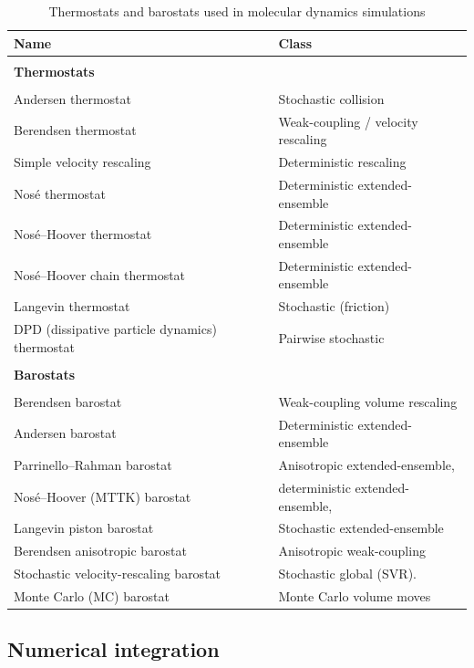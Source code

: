 \documentclass[12pt]{article}
\begin{document}
\begin{table}
\centering
\caption{ Thermostats and barostats used in molecular dynamics simulations}
\label{tab:thermostats_barostats}
\begin{tabular}{ll}
\hline
\textbf{Name} & \textbf{Class} \\
\hline
\\
\textbf{Thermostats} \\
\\
Andersen thermostat  & Stochastic collision \\
Berendsen thermostat & Weak-coupling / velocity rescaling \\
Simple velocity rescaling & Deterministic rescaling \\
Nos\'e thermostat & Deterministic extended-ensemble \\
Nos\'e--Hoover thermostat & Deterministic extended-ensemble \\
Nos\'e--Hoover chain thermostat & Deterministic extended-ensemble \\
Langevin thermostat & Stochastic (friction) \\
DPD (dissipative particle dynamics) thermostat & Pairwise stochastic \\
\hline
\hline
\\
\textbf{Barostats}\\
\\
Berendsen barostat & Weak-coupling volume rescaling \\
Andersen barostat & Deterministic extended-ensemble \\
Parrinello--Rahman barostat & Anisotropic extended-ensemble,  \\
Nos\'e--Hoover (MTTK) barostat & deterministic extended-ensemble,  \\
Langevin piston barostat & Stochastic extended-ensemble \\
Berendsen anisotropic barostat & Anisotropic weak-coupling \\
Stochastic velocity-rescaling barostat & Stochastic global (SVR). \\
Monte Carlo (MC) barostat & Monte Carlo volume moves \\
\hline
\end{tabular}
\end{table}


\subsection{Numerical integration}
\end{document}
